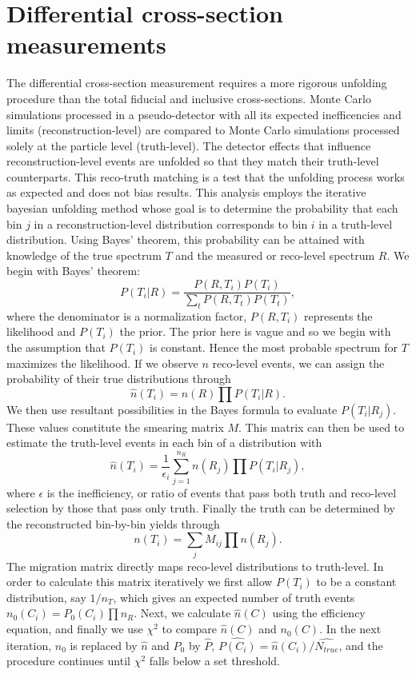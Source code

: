 \section{Differential cross-section measurements}
The differential cross-section measurement requires a more rigorous unfolding procedure than the total fiducial and inclusive cross-sections. Monte Carlo simulations processed in a pseudo-detector with all its expected inefficencies and limits (reconstruction-level) are compared to Monte Carlo simulations processed solely at the particle level (truth-level). The detector effects that influence reconstruction-level events are unfolded so that they match their truth-level counterparts. This reco-truth matching is a test that the unfolding process works as expected and does not bias results. This analysis employs the iterative bayesian unfolding method \cite{bayesian} whose goal is to determine the probability that each bin $j$ in a reconstruction-level distribution corresponds to bin $i$ in a truth-level distribution. Using Bayes' theorem, this probability can be attained with knowledge of the true spectrum $T$ and the measured or reco-level spectrum $R$. We begin with Bayes' theorem: 
\begin{equation}
P(T_i|R)=\frac{P(R,T_i)P(T_i)}{\sum_{t} P(R,T_t)P(T_t)},
\end{equation}
where the denominator is a normalization factor, $P(R,T_i)$ represents the likelihood and $P(T_i)$ the prior. The prior here is vague and so we begin with the assumption that $P(T_i)$ is constant. Hence the most probable spectrum for $T$ maximizes the likelihood. If we observe $n$ reco-level events, we can assign the probability of their true distributions through
\begin{equation}
\hat{n}(T_i)=n(R)\prod P(T_i|R).
\end{equation}
We then use resultant possibilities in the Bayes formula to evaluate $P(T_i|R_j)$. These values constitute the smearing matrix $M$. This matrix can then be used to estimate the truth-level events in each bin of a distribution with
\begin{equation}
\hat{n}(T_i)=\frac{1}{\epsilon_i}\sum_{j=1}^{n_R} n(R_j)\prod P(T_i|R_j),
\end{equation}
where $\epsilon$ is the inefficiency, or ratio of events that pass both truth and reco-level selection by those that pass only truth. Finally the truth can be determined by the reconstructed bin-by-bin yields through
\begin{equation}
n(T_i)=\sum_j M_{ij} \prod n(R_j).
\end{equation}
The migration matrix directly maps reco-level distributions to truth-level. In order to calculate this matrix iteratively we first allow $P(T_i)$ to be a constant distribution, say $1/n_T$, which gives an expected number of truth events $n_0(C_i)=P_0(C_i)\prod n_R$. Next, we calculate $\hat{n}(C)$ using the efficiency equation, and finally we use $\chi^2$ to compare $\hat{n}(C)$ and $n_0(C)$. In the next iteration, $n_0$ is replaced by $\hat{n}$ and $P_0$ by $\hat{P}$, $\hat{P(C_i)}=\hat{n}(C_i)/\hat{N_{true}}$, and the procedure continues until $\chi^2$ falls below a set threshold. 

